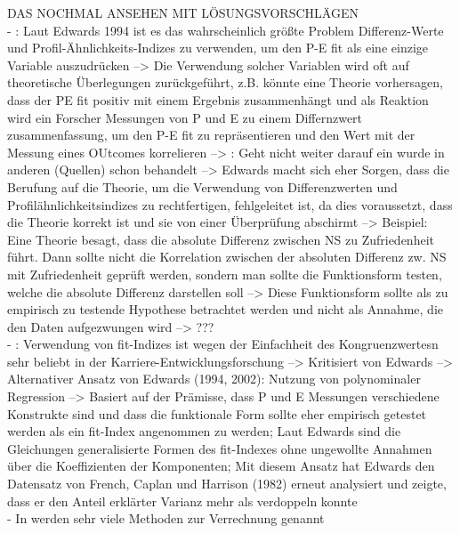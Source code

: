 DAS NOCHMAL ANSEHEN MIT LÖSUNGSVORSCHLÄGEN \\
- \cite[S. 55]{edwards:2008}: Laut Edwards 1994 ist es das wahrscheinlich größte Problem Differenz-Werte und Profil-Ähnlichkeits-Indizes zu verwenden, um den P-E fit als eine einzige Variable auszudrücken --> Die Verwendung solcher Variablen wird oft auf theoretische Überlegungen zurückgeführt, z.B. könnte eine Theorie vorhersagen, dass der PE fit positiv mit einem Ergebnis zusammenhängt und als Reaktion wird ein Forscher Messungen von P und E zu einem Differnzwert zusammenfassung, um den P-E fit zu repräsentieren und den Wert mit der Messung eines OUtcomes korrelieren --> \cite[S. 56]{edwards:2008}: Geht nicht weiter darauf ein wurde in anderen (Quellen) schon behandelt --> Edwards macht sich eher Sorgen, dass die Berufung auf die Theorie, um die Verwendung von Differenzwerten und Profilähnlichkeitsindizes zu rechtfertigen, fehlgeleitet ist, da dies voraussetzt, dass die Theorie korrekt ist und sie von einer Überprüfung abschirmt --> Beispiel: Eine Theorie besagt, dass die absolute Differenz zwischen NS zu Zufriedenheit führt. Dann sollte nicht die Korrelation zwischen der absoluten Differenz zw. NS mit Zufriedenheit geprüft werden, sondern man sollte die Funktionsform testen, welche die absolute Differenz darstellen soll --> Diese Funktionsform sollte als zu empirisch zu testende Hypothese betrachtet werden und nicht als Annahme, die den Daten aufgezwungen wird --> ??? \\
- \cite[S. 7]{su:2015}: Verwendung von fit-Indizes ist wegen der Einfachheit des Kongruenzwertesn sehr beliebt in der Karriere-Entwicklungsforschung --> Kritisiert von Edwards --> Alternativer Ansatz von Edwards (1994, 2002): Nutzung von polynominaler Regression --> Basiert auf der Prämisse, dass P und E Messungen verschiedene Konstrukte sind und dass die funktionale Form sollte eher empirisch getestet werden als ein fit-Index angenommen zu werden; Laut Edwards sind die Gleichungen generalisierte Formen des fit-Indexes ohne ungewollte Annahmen über die Koeffizienten der Komponenten; Mit diesem Ansatz hat Edwards den Datensatz von French, Caplan und Harrison (1982) erneut analysiert und zeigte, dass er den Anteil erklärter Varianz mehr als verdoppeln konnte \\
- In \textcite{edwards:1991} werden sehr viele Methoden zur Verrechnung genannt \\

